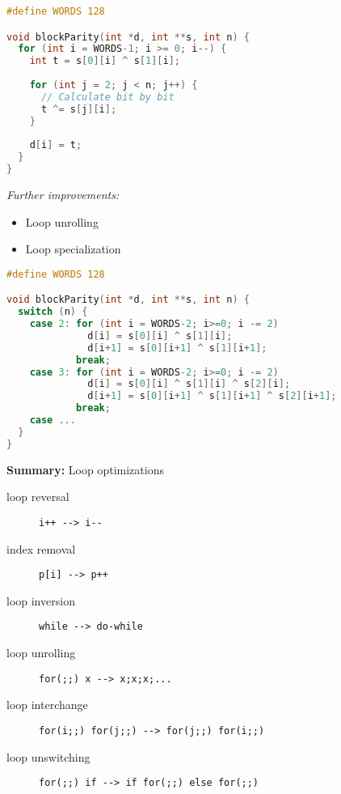 \begin{lstlisting}[language=C]
#define WORDS 128

void blockParity(int *d, int **s, int n) { 
  for (int i = WORDS-1; i >= 0; i--) { 
    int t = s[0][i] ^ s[1][i];
    
    for (int j = 2; j < n; j++) {
      // Calculate bit by bit
      t ^= s[j][i]; 
    }
    
    d[i] = t; 
  } 
}
\end{lstlisting}

\textit{Further improvements:}

\begin{itemize}
\item Loop unrolling
\item Loop specialization
\end{itemize}

\begin{lstlisting}[language=C]
#define WORDS 128 

void blockParity(int *d, int **s, int n) { 
  switch (n) { 
    case 2: for (int i = WORDS-2; i>=0; i -= 2) 
              d[i] = s[0][i] ^ s[1][i];
              d[i+1] = s[0][i+1] ^ s[1][i+1]; 
            break; 
    case 3: for (int i = WORDS-2; i>=0; i -= 2) 
              d[i] = s[0][i] ^ s[1][i] ^ s[2][i];
              d[i+1] = s[0][i+1] ^ s[1][i+1] ^ s[2][i+1]; 
            break; 
    case ...
  } 
}
\end{lstlisting}

\begin{shadedSmaller}
\textbf{Summary:} Loop optimizations

\begin{description}
\item[loop reversal] \lstinline|i++ --> i--|
\item[index removal] \lstinline|p[i] --> p++|
\item[loop inversion] \lstinline|while --> do-while|
\item[loop unrolling] \lstinline|for(;;) x --> x;x;x;...|
\item[loop interchange] \lstinline|for(i;;) for(j;;) --> for(j;;) for(i;;)|
\item[loop unswitching] \lstinline|for(;;) if --> if for(;;) else for(;;)|
\end{description}
\end{shadedSmaller}

